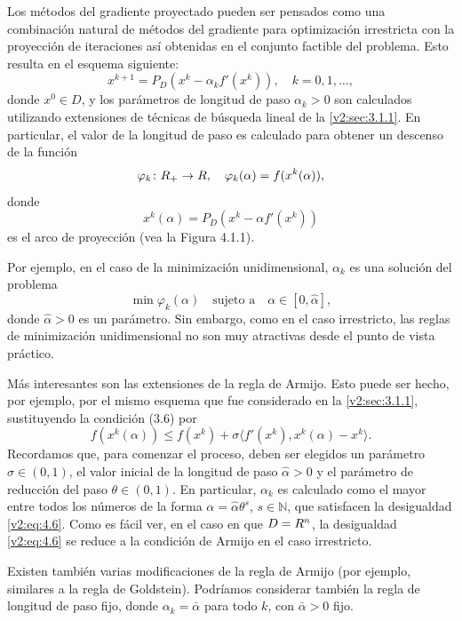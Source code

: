 Los métodos del gradiente proyectado pueden ser pensados como una combinación natural de métodos del gradiente para optimización irrestricta con la proyección de iteraciones así obtenidas en el conjunto factible del problema. Esto resulta en el esquema siguiente:
\begin{equation}
    x^{k+1} = P_D(x^k - \alpha_k f'(x^k)), \quad k = 0, 1, \dots,
    \label{v2:eq:4.4}
\end{equation}
donde $x^0 \in D$, y los parámetros de longitud de paso $\alpha_k > 0$ son calculados utilizando extensiones de técnicas de búsqueda lineal de la \cref{v2:sec:3.1.1}. En particular, el valor de la longitud de paso es calculado para obtener un descenso de la función
\[
    \varphi_k \colon R_+ \to R, \quad \varphi_k(\alpha) = f(x^k(\alpha)),
\]
donde
\begin{equation}
    x^k(\alpha) = P_D(x^k - \alpha f'(x^k))
    \label{v2:eq:4.5}
\end{equation}
es el arco de proyección (vea la Figura 4.1.1).


Por ejemplo, en el caso de la minimización unidimensional, $\alpha_k$ es una solución del problema
\[
    \min \varphi_k(\alpha) \quad \text{sujeto a} \quad \alpha \in [0, \hat{\alpha}],
\]
donde $\hat{\alpha} > 0$ es un parámetro. Sin embargo, como en el caso irrestricto, las reglas de minimización unidimensional no son muy atractivas desde el punto de vista práctico.

Más interesantes son las extensiones de la regla de Armijo. Esto puede ser hecho, por ejemplo, por el mismo esquema que fue considerado en la \cref{v2:sec:3.1.1}, sustituyendo la condición (3.6) por
\begin{equation}
    f(x^k(\alpha)) \le f(x^k) + \sigma \langle f'(x^k), x^k(\alpha) - x^k \rangle.
    \label{v2:eq:4.6}
\end{equation}
Recordamos que, para comenzar el proceso, deben ser elegidos un parámetro $\sigma \in (0, 1)$, el valor inicial de la longitud de paso $\hat{\alpha} > 0$ y el parámetro de reducción del paso $\theta \in (0, 1)$. En particular, $\alpha_k$ es calculado como el mayor entre todos los números de la forma $\alpha = \hat{\alpha} \theta^s$, $s \in \mathbb{N}$, que satisfacen la desigualdad \eqref{v2:eq:4.6}. Como es fácil ver, en el caso en que $D = R^n$, la desigualdad \eqref{v2:eq:4.6} se reduce a la condición de Armijo en el caso irrestricto.

Existen también varias modificaciones de la regla de Armijo (por ejemplo, similares a la regla de Goldstein). Podríamos considerar también la regla de longitud de paso fijo, donde $\alpha_k = \bar{\alpha}$ para todo $k$, con $\bar{\alpha} > 0$ fijo.

